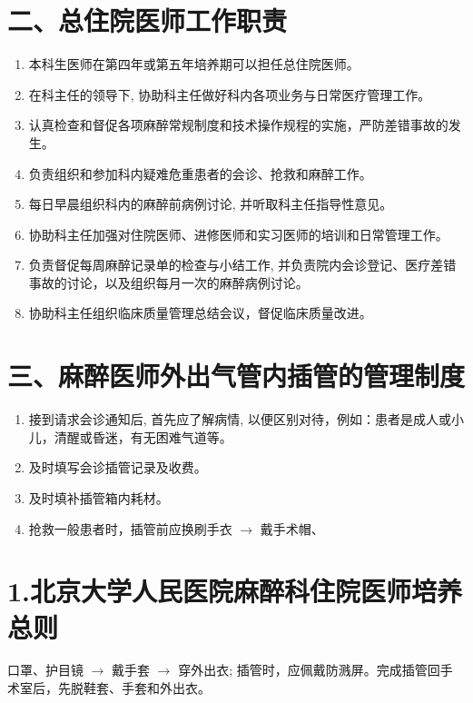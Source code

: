 \documentclass[10pt]{article}
\begin{document}
\section*{二、总住院医师工作职责}
\begin{enumerate}
  \item 本科生医师在第四年或第五年培养期可以担任总住院医师。

  \item 在科主任的领导下, 协助科主任做好科内各项业务与日常医疗管理工作。

  \item 认真检查和督促各项麻醉常规制度和技术操作规程的实施，严防差错事故的发生。

  \item 负责组织和参加科内疑难危重患者的会诊、抢救和麻醉工作。

  \item 每日早晨组织科内的麻醉前病例讨论, 并听取科主任指导性意见。

  \item 协助科主任加强对住院医师、进修医师和实习医师的培训和日常管理工作。

  \item 负责督促每周麻醉记录单的检查与小结工作, 并负责院内会诊登记、医疗差错事故的讨论，以及组织每月一次的麻醉病例讨论。

  \item 协助科主任组织临床质量管理总结会议，督促临床质量改进。

\end{enumerate}

\section*{三、麻醉医师外出气管内插管的管理制度}
\begin{enumerate}
  \item 接到请求会诊通知后, 首先应了解病情, 以便区别对待，例如：患者是成人或小儿，清醒或昏迷，有无困难气道等。

  \item 及时填写会诊插管记录及收费。

  \item 及时填补插管箱内耗材。

  \item 抢救一般患者时，插管前应换刷手衣 $\rightarrow$ 戴手术帽、

\end{enumerate}

\section*{1.北京大学人民医院麻醉科住院医师培养总则}
口罩、护目镜 $\rightarrow$ 戴手套 $\rightarrow$ 穿外出衣; 插管时，应佩戴防溅屏。完成插管回手术室后，先脱鞋套、手套和外出衣。
\end{document}
